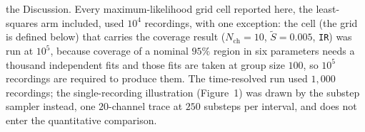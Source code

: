 the Discussion.
Every
maximum-likelihood grid cell reported here, the least-squares arm included, used
$10^4$ recordings, with one exception: the cell (the grid is defined below) that carries the coverage result
($N_{\mathrm{ch}}=10$, $\widetilde{S} = 0.005$, \texttt{IR}) was run at
$10^5$, because coverage of a nominal $95\%$ region in six parameters needs a thousand
independent fits and those fits are taken at group size $100$, so $10^5$ recordings are
required to produce them. The time-resolved run used $1{,}000$ recordings; the
single-recording illustration (Figure~1) was drawn by the substep sampler instead,
one $20$-channel trace at $250$ substeps per interval, and does not enter the
quantitative comparison.

